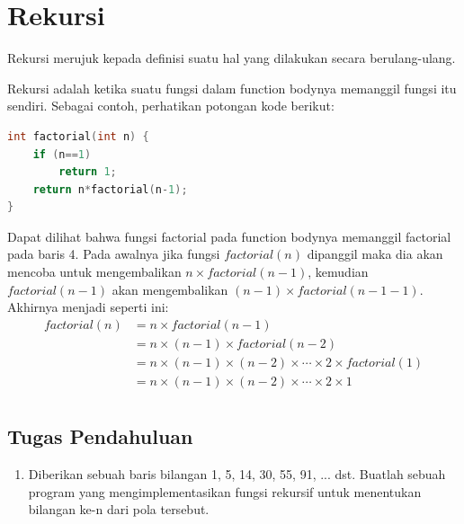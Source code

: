 \section{Rekursi}
Rekursi merujuk kepada definisi suatu hal yang dilakukan secara berulang-ulang.

Rekursi adalah ketika suatu fungsi dalam function bodynya memanggil fungsi itu sendiri.
Sebagai contoh, perhatikan potongan kode berikut:
\begin{lstlisting}[language=c,caption = Factorial dengan rekursi,label=lst:recursionexample01]
int factorial(int n) {
    if (n==1)
        return 1;
    return n*factorial(n-1);
}
\end{lstlisting}
Dapat dilihat bahwa fungsi factorial pada function bodynya memanggil factorial pada baris 4.
Pada awalnya jika fungsi $factorial(n)$ dipanggil maka dia akan mencoba untuk mengembalikan
$n\times factorial(n-1)$, kemudian $factorial(n-1)$ akan mengembalikan $(n-1)\times factorial(n-1-1)$.
Akhirnya menjadi seperti ini:
\begin{equation*}
    \begin{split}
        factorial(n)& = n \times factorial(n-1)\\
        & = n \times (n-1) \times factorial(n-2)\\
        & = n \times (n-1) \times (n-2) \times \cdots \times 2 \times factorial(1)\\
        & = n \times (n-1) \times (n-2) \times \cdots \times 2 \times 1\\
    \end{split}
\end{equation*}

\subsection{Tugas Pendahuluan}
\begin{enumerate}
    \item Diberikan sebuah baris bilangan 1, 5, 14, 30, 55, 91, ... dst. Buatlah sebuah program yang mengimplementasikan fungsi rekursif untuk menentukan bilangan ke-n dari pola tersebut.
\end{enumerate}